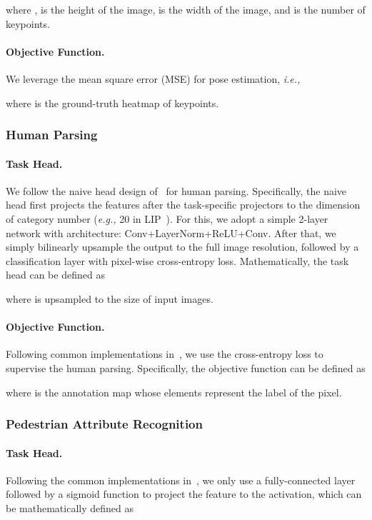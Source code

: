 \documentclass[10pt,twocolumn,letterpaper]{article}
\begin{document}
where ,  is the height of the image,  is the width of the image, and  is the number of keypoints.
\paragraph{Objective Function.} We leverage the mean square error (MSE) for pose estimation, \emph{i.e.,}

where  is the ground-truth heatmap of keypoints.


\subsubsection{Human Parsing}
\paragraph{Task Head.} We follow the naive head design of~\cite{zheng2021rethinking} for human parsing. Specifically, the naive head first projects the features after the task-specific projectors to the dimension of category number (\emph{e.g.,} 20 in LIP~\cite{liang2018look}). For this, we adopt a simple 2-layer network with architecture:  Conv+LayerNorm+ReLU+Conv. After that, we simply bilinearly upsample the output to the full image resolution, followed by a classification layer with pixel-wise cross-entropy loss. Mathematically, the task head can be defined as


where  is upsampled to the size of input images. 


\paragraph{Objective Function.} Following common implementations in~\cite{yuan2110hrformer}, we use the cross-entropy loss to supervise the human parsing. Specifically, the objective function can be defined as

where  is the annotation map whose elements represent the label of the pixel.

\subsubsection{Pedestrian Attribute Recognition}
\paragraph{Task Head.} Following the common implementations in~\cite{li2022label2label}, we only use a fully-connected layer followed by a sigmoid function to project the feature to the activation, which can be mathematically defined as 
\end{document}
